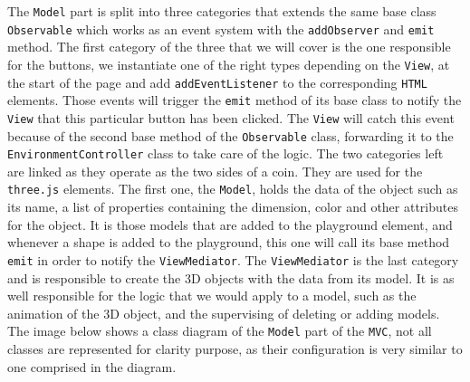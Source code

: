 \documentclass{scrbook}
\begin{document}
The \texttt{Model} part is split into three categories that extends the same base class \texttt{Observable} which works as an event system with the \texttt{addObserver} and \texttt{emit} method. 
The first category of the three that we will cover is the one responsible for the buttons, we instantiate one of the right types depending on the \texttt{View}, at the start of the page and add \texttt{addEventListener} to the corresponding \texttt{HTML} elements. 
Those events will trigger the \texttt{emit} method of its base class to notify the \texttt{View} that this particular button has been clicked. The \texttt{View} will catch this event because of the second base method of the \texttt{Observable} class, 
forwarding it to the \texttt{EnvironmentController} class to take care of the logic. 
The two categories left are linked as they operate as the two sides of a coin. They are used for the \texttt{three.js} elements. The first one, the \texttt{Model}, holds the data of the object such as its name, a list of properties containing the dimension, 
color and other attributes for the object. It is those models that are added to the playground element, and whenever a shape is added to the playground, this one will call its base method \texttt{emit} in order to notify the \texttt{ViewMediator}. 
The \texttt{ViewMediator} is the last category and is responsible to create the 3D objects with the data from its model. It is as well responsible for the logic that we would apply to a model, such as the animation of the 3D object, and the supervising of deleting or adding models.     
The image below shows a class diagram of the \texttt{Model} part of the \texttt{MVC}, not all classes are represented for clarity purpose, as their configuration is very similar to one comprised in the diagram.
\end{document}
